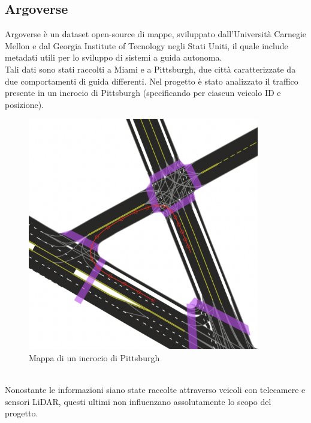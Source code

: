 \documentclass[italian]{report}
\begin{document}
\subsection{Argoverse}
Argoverse è un dataset open-source di mappe, sviluppato dall'Università Carnegie Mellon e dal Georgia Institute of Tecnology negli Stati Uniti, il quale include metadati utili per lo sviluppo di sistemi a guida autonoma.\\
Tali dati sono stati raccolti a Miami e a Pittsburgh, due città caratterizzate da due comportamenti di guida differenti. Nel progetto è stato analizzato il traffico presente in un incrocio di Pittsburgh (specificando per ciascun veicolo ID e posizione).\\
\begin{figure}[H]
	\centering
	\includegraphics[width=0.9\textwidth]{Pittsburgh}
	\footnotesize
	\caption{Mappa di un incrocio di Pittsburgh}
\end{figure}\\
Nonostante le informazioni siano state raccolte attraverso veicoli con telecamere e sensori LiDAR, questi ultimi non influenzano assolutamente lo scopo del progetto.
\end{document}
